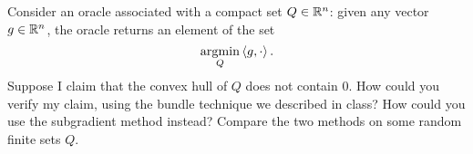 \documentclass[10pt]{article}
\begin{document}
\begin{Exercise}
    Consider an oracle associated with a compact set $Q \in \mathbb{R}^n$: given any
    vector $g \in \mathbb{R}^n$, the oracle returns an element of the set
    \[
        \operatorname*{argmin}_{Q} \left\langle g, \cdot \right\rangle.
    \]
    Suppose I claim that the convex hull of $Q$ does not contain $0$. How could
    you verify my claim, using the bundle technique we described in class? How
    could you use the subgradient method instead? Compare the two methods on
    some random finite sets $Q$.
\end{Exercise}




\end{document}
